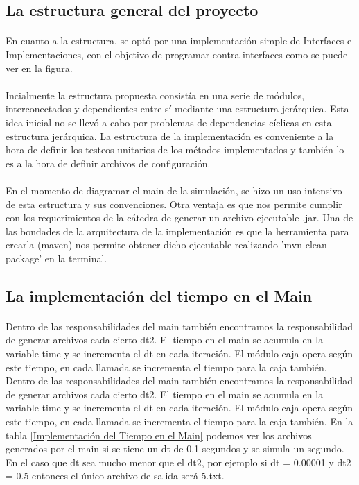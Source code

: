 \documentclass{article}
\begin{document}
\subsection{La estructura general del proyecto}

\paragraph{}
En cuanto a la estructura, se optó por una implementación simple de Interfaces e Implementaciones, con el objetivo de programar contra interfaces como se puede ver en la figura.

\paragraph{}
Incialmente la estructura propuesta consistía en una serie de módulos, interconectados y dependientes entre sí mediante una estructura jerárquica. Esta idea inicial no se llevó a cabo por problemas de dependencias cíclicas en esta estructura jerárquica. La estructura de la implementación es conveniente a la hora de definir los testeos unitarios de los métodos implementados y también lo es a la hora de definir archivos de configuración. 

\paragraph{}
En el momento de diagramar el main de la simulación, se hizo un uso intensivo de esta estructura y sus convenciones. Otra ventaja es que nos permite cumplir con los requerimientos de la cátedra de generar un archivo ejecutable .jar. Una de las bondades de la arquitectura de la implementación es que la herramienta para crearla (maven) nos permite obtener dicho ejecutable realizando 'mvn clean package' en la terminal.

\subsection{La implementación del tiempo en el Main}

\paragraph{}
Dentro de las responsabilidades del main también encontramos la responsabilidad de generar archivos cada cierto dt2. El tiempo en el main se acumula en la variable time y se incrementa el dt en cada iteración. El módulo caja opera según este tiempo, en cada llamada se incrementa el tiempo para la caja también. Dentro de las responsabilidades del main también encontramos la responsabilidad de generar archivos cada cierto dt2. El tiempo en el main se acumula en la variable time y se incrementa el dt en cada iteración. El módulo caja opera según este tiempo, en cada llamada se incrementa el tiempo para la caja también. En la tabla \ref{Implementación del Tiempo en el Main} podemos ver los archivos generados por el main si se tiene un dt de 0.1 segundos y se simula un segundo. En el caso que dt sea mucho  menor que el dt2, por ejemplo si dt = 0.00001 y dt2 = 0.5 entonces el único archivo de salida será 5.txt.
\end{document}
